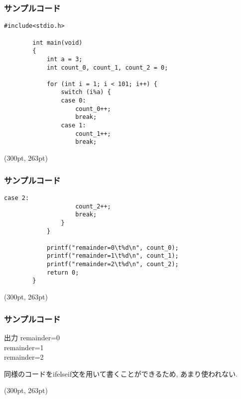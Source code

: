 \documentclass[dvipdfmx]{beamer}
\begin{document}
\begin{frame}[t, fragile, label=39]
    \frametitle{サンプルコード}
    \begin{lstlisting}[gobble=8, caption=pra\_switch.c, label=pra-switch1]
        #include<stdio.h>

        int main(void)
        {
            int a = 3;
            int count_0, count_1, count_2 = 0;
            
            for (int i = 1; i < 101; i++) {
                switch (i%a) {
                case 0:
                    count_0++;
                    break;  
                case 1:
                    count_1++;
                    break;
    \end{lstlisting}
    \begin{textblock*}{0.3\linewidth}(300pt, 263pt)
    \hyperlink{38}{}
    \space
    \hyperlink{40}{}
    \end{textblock*}
\end{frame}

\begin{frame}[t, fragile, label=40]
    \frametitle{サンプルコード}
    \begin{lstlisting}[firstnumber=16, gobble=8, caption=pra\_switch.c, label=pra-switch2]
                case 2:
                    count_2++;
                    break;
                }
            }

            printf("remainder=0\t%d\n", count_0);
            printf("remainder=1\t%d\n", count_1);
            printf("remainder=2\t%d\n", count_2);
            return 0;
        }
    \end{lstlisting}
    \begin{textblock*}{0.3\linewidth}(300pt, 263pt)
    \hyperlink{39}{}
    \space
    \hyperlink{41}{}
    \end{textblock*}
\end{frame}

\begin{frame}[label=41]
    \frametitle{サンプルコード}
    \begin{block}{出力} 
        remainder=0\\
        remainder=1\\
        remainder=2
    \end{block}
    同様のコードをif\space else\space if文を用いて書くことができるため,
    あまり使われない.
    \begin{textblock*}{0.3\linewidth}(300pt, 263pt)
    \hyperlink{40}{}
    \space
    \hyperlink{42}{}
    \end{textblock*}
\end{frame}
\end{document}
